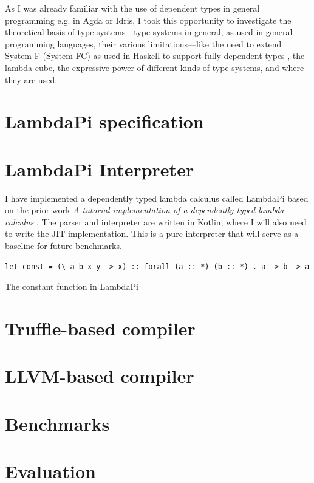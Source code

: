 \documentclass[english,zadani,odsaz]{fitthesis}
\begin{document}
As I was already familiar with the use of dependent types in general programming
e.g.  in Agda or Idris, I took this opportunity to investigate the theoretical
basis of type systems - type systems in general, as used in general programming
languages, their various limitations---like the need to extend System F (System
FC) as used in Haskell to support fully dependent types
\cite{eisenberg2016dependent}, the lambda cube, the expressive power of
different kinds of type systems, and where they are used.


\chapter{LambdaPi specification}
\label{sec:org495e9bb}

\chapter{LambdaPi Interpreter}
\label{sec:org777ba4e}
I have implemented a dependently typed lambda calculus called LambdaPi based on
the prior work \emph{A tutorial implementation of a dependently typed lambda calculus}
\cite{loh2010tutorial}. The parser and interpreter are written in Kotlin, where
I will also need to write the JIT implementation. This is a pure interpreter
that will serve as a baseline for future benchmarks.

\begin{listing}[!htpb]
\begin{verbatim}
let const = (\ a b x y -> x) :: forall (a :: *) (b :: *) . a -> b -> a
\end{verbatim}
\caption{The constant function in LambdaPi}
\end{listing}

\chapter{Truffle-based compiler}
\label{sec:org233c730}

\chapter{LLVM-based compiler}
\label{sec:orgf2f99c1}

\chapter{Benchmarks}
\label{sec:org0a20009}

\chapter{Evaluation}
\label{sec:org4810524}
\end{document}
